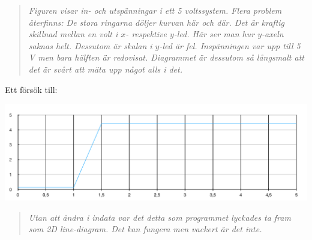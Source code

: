 \documentclass[onepage,swedish,a4paper,12pt]{scrbook}
\begin{document}
\begin{quote}
\emph{Figuren visar in- och utspänningar i ett 5 voltssystem. Flera problem återfinns: De stora ringarna döljer kurvan här och där. Det är kraftig skillnad mellan en volt i $x$- respektive $y$-led. Här ser man hur $y$-axeln saknas helt. Dessutom är skalan i $y$-led är fel. Inspänningen var upp till 5 V men bara hälften är redovisat. Diagrammet är dessutom så långsmalt att det är svårt att mäta upp något alls i det.}
\end{quote}

Ett försök till: 

\begin{center}
\includegraphics[scale=.5]{skiss2.pdf}
\end{center}


\begin{quote}
\emph{Utan att ändra i indata var det detta som programmet lyckades ta fram som \textsf{2D line}-diagram. Det kan fungera men vackert är det inte.}
\end{quote}

\begin{center}
\end{center}
\end{document}
